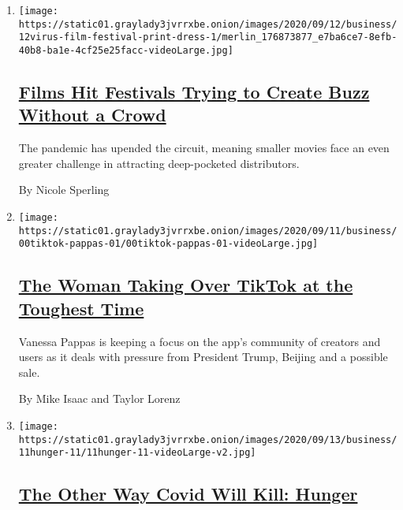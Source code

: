 \begin{enumerate}
\def\labelenumi{\arabic{enumi}.}
\item
  \texttt{[image: https://static01.graylady3jvrrxbe.onion/images/2020/09/12/business/12virus-film-festival-print-dress-1/merlin\_176873877\_e7ba6ce7-8efb-40b8-ba1e-4cf25e25facc-videoLarge.jpg]}

  \hypertarget{films-hit-festivals-trying-to-create-buzz-without-a-crowd}{%
  \subsection{\texorpdfstring{\href{/2020/09/12/business/media/concrete-cowboy-toronto-film-festival.html}{Films
  Hit Festivals Trying to Create Buzz Without a
  Crowd}}{Films Hit Festivals Trying to Create Buzz Without a Crowd}}\label{films-hit-festivals-trying-to-create-buzz-without-a-crowd}}

  The pandemic has upended the circuit, meaning smaller movies face an
  even greater challenge in attracting deep-pocketed distributors.

  By Nicole Sperling
\item
  \texttt{[image: https://static01.graylady3jvrrxbe.onion/images/2020/09/11/business/00tiktok-pappas-01/00tiktok-pappas-01-videoLarge.jpg]}

  \hypertarget{the-woman-taking-over-tiktok-at-the-toughest-time}{%
  \subsection{\texorpdfstring{\href{/2020/09/11/technology/tiktok-vanessa-pappas-bytedance.html}{The
  Woman Taking Over TikTok at the Toughest
  Time}}{The Woman Taking Over TikTok at the Toughest Time}}\label{the-woman-taking-over-tiktok-at-the-toughest-time}}

  Vanessa Pappas is keeping a focus on the app's community of creators
  and users as it deals with pressure from President Trump, Beijing and
  a possible sale.

  By Mike Isaac and Taylor Lorenz
\item
  \texttt{[image: https://static01.graylady3jvrrxbe.onion/images/2020/09/13/business/11hunger-11/11hunger-11-videoLarge-v2.jpg]}

  \hypertarget{the-other-way-covid-will-kill-hunger}{%
  \subsection{\texorpdfstring{\href{/2020/09/11/business/covid-hunger-food-insecurity.html}{The
  Other Way Covid Will Kill:
  Hunger}}{The Other Way Covid Will Kill: Hunger}}\label{the-other-way-covid-will-kill-hunger}}


\end{enumerate}
